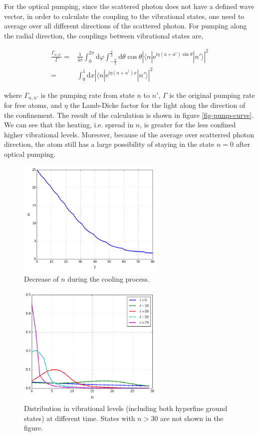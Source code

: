 \documentclass[aps,twocolumn,secnumarabic,balancelastpage,amsmath,amssymb,nofootinbib]{revtex4}
\newcommand{\ud}{\mathrm{d}}
\newcommand{\ue}{\mathrm{e}}
\newcommand{\ui}{\mathrm{i}}
\newcommand{\eqar}[1]
{
  \begin{align*}
    #1
  \end{align*}
}
\newcommand{\paren}[1]{{\left({#1}\right)}}
\newcommand{\abs}[1]{{\left|{#1}\right|}}
\begin{document}
For the optical pumping, since the scattered photon does not have a defined wave vector, in order to calculate the coupling to the vibrational states, one need to average over all different directions of the scattered photon. For pumping along the radial direction, the couplings between vibrational states are,
\eqar{
  \frac{\Gamma_{n,n'}}{\Gamma}=&\frac{1}{4\pi}\int_{0}^{2\pi}\ud\varphi\int_{-\frac\pi2}^{\frac\pi2}\ud\theta\cos\theta\abs{\langle n|\ue^{\ui\eta\paren{a+a^\dagger}\sin\theta}|n'\rangle}^2\\
  =&\int_{0}^{1}\ud x\abs{\langle n|\ue^{\ui\eta\paren{a+a^\dagger}x}|n'\rangle}^2
}
where $\Gamma_{n,n'}$ is the pumping rate from state $n$ to $n'$, $\Gamma$ is the original pumping rate for free atoms, and $\eta$ the Lamb-Dicke factor for the light along the direction of the confinement. The result of the calculation is shown in figure \ref{fig-pump-curve}. We can see that the heating, i.e. spread in $n$, is greater for the less confined higher vibrational levels. Moreover, because of the average over scatterred photon direction, the atom still has a large possibility of staying in the state $n=0$ after optical pumping.

\begin{figure}
  \begin{center}
    \includegraphics[width=7cm]{../n_decrease.png}
  \end{center}
  \caption{Decrease of $n$ during the cooling process.}
  \label{fig-n-decrease}
\end{figure}
\begin{figure}
  \begin{center}
    \includegraphics[width=7cm]{../cool_process.png}
  \end{center}
  \caption{Distribution in vibrational levels (including both hyperfine ground states) at different time. States with $n>30$ are not shown in the figure.}
  \label{fig-cool-process}
\end{figure}
\end{document}
